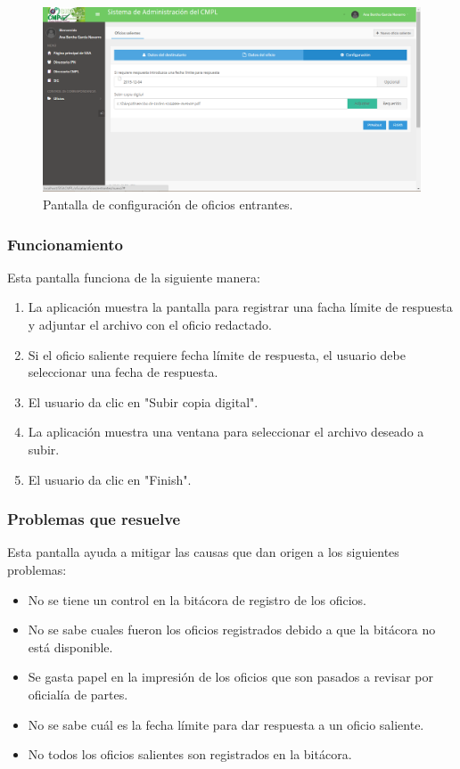 	\begin{figure}[htbp!]
		\centering
			\includegraphics[width=1\textwidth]{Pantallas/Wizard3ConfiguracionSaliente.png}
		\caption{Pantalla de configuración de oficios entrantes.}
		\label{fig:Wizard3ConfiguracionSaliente}
	\end{figure}

\subsubsection{Funcionamiento}
	Esta pantalla funciona de la siguiente manera:
	
	\begin{enumerate}
		\item La aplicación muestra la pantalla para registrar una facha límite de respuesta y adjuntar el archivo con el oficio redactado.
		\item Si el oficio saliente requiere fecha límite de respuesta, el usuario debe seleccionar una fecha de respuesta.
		\item El usuario da clic en "Subir copia digital".
		\item La aplicación muestra una ventana para seleccionar el archivo deseado a subir.
		\item El usuario da clic en "Finish".
	\end{enumerate}

\subsubsection{Problemas que resuelve}
Esta pantalla ayuda a mitigar las causas que dan origen a los siguientes problemas:

	\begin{itemize}
		\item No se tiene un control en la bitácora de registro de los oficios.
		\item No se sabe cuales fueron los oficios registrados debido a que la bitácora no está disponible.
		\item Se gasta papel en la impresión de los oficios que son pasados a revisar por oficialía de partes.
		\item No se sabe cuál es la fecha límite para dar respuesta a un oficio saliente.
		\item No todos los oficios salientes son registrados en la bitácora.
	\end{itemize}

